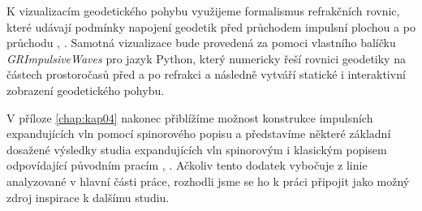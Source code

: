 K vizualizacím geodetického pohybu využijeme
formalismus refrakčních rovnic, které udávají podmínky napojení geodetik před průchodem impulsní plochou a po průchodu \cite{Podolsky:2014ysa}, \cite{Podolsky_2017}.
Samotná vizualizace bude provedená za pomoci vlastního balíčku \emph{GRImpulsiveWaves} pro jazyk Python, který numericky řeší rovnici geodetiky na
částech prostoročasů před a po refrakci a následně vytváří statické i interaktivní zobrazení geodetického pohybu.

V příloze \ref{chap:kap04} nakonec přiblížíme možnost konstrukce impulsních expandujících vln pomocí spinorového popisu a představíme některé základní
dosažené výsledky studia expandujících vln spinorovým i klasickým popisem odpovídající původním pracím \cite{PenroseNutku1992}, \cite{Podolsky:2016mqg}.
Ačkoliv tento dodatek vybočuje z linie analyzované v hlavní části práce, rozhodli jsme se ho k práci
připojit jako možný zdroj inspirace k dalšímu studiu.


\clearpage